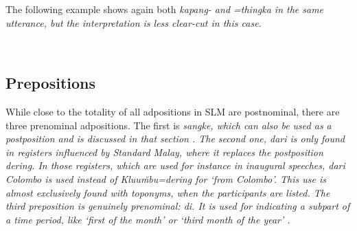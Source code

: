 The following example shows again both \em kapang- \em and \em =thingka \em in the same utterance, but the interpretation is less clear-cut in this case.


 \\ 

\subsection{Prepositions}\label{sec:morph:Prepositions}
While close to the totality of all adpositions in SLM are postnominal, there are three prenominal  adpositions. The first is \em sangke\em, which can also be used as a postposition and is discussed in that section . The second one, \em dari \em is only found in registers influenced by Standard Malay, where it replaces the postposition \em dering\em. In those registers, which are used for instance in inaugural speeches, \em dari Colombo \em is used instead of \em Kluu\u mbu=dering \em for `from Colombo'. This use is almost exclusively found with toponyms, when the participants are listed. The third preposition is genuinely prenominal: \em di\em. It is used for indicating a subpart of a time period, like `first of the month' or `third month of the year' .


